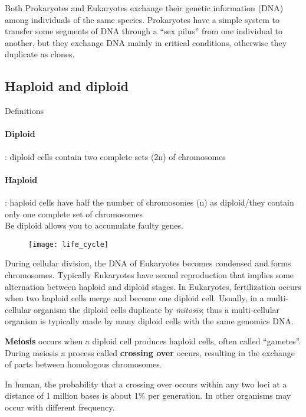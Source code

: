 Both Prokaryotes and Eukaryotes exchange their genetic information (DNA)
among individuals of the same species. Prokaryotes have a simple system to
transfer some segments of DNA through a ``sex pilus'' from one individual to
another, but they exchange DNA mainly in critical conditions, otherwise they
duplicate as clones.

\subsection{Haploid and diploid}

Definitions

\paragraph*{Diploid}: diploid cells contain two complete sets (2n) of
chromosomes

\paragraph*{Haploid}: haploid cells have half the number of chromosomes (n) as
diploid/they contain only one complete set of chromosomes \\


Be diploid allows you to accumulate faulty genes.

\begin{figure}[H]
  \centering
  \texttt{[image: life\_cycle]}
\end{figure}

During cellular division, the DNA of Eukaryotes becomes condensed and forms
chromosomes. Typically Eukaryotes have sexual reproduction that implies some
alternation between haploid and diploid stages. In Eukaryotes, fertilization
occurs when two haploid cells merge and become one diploid cell. Usually, in a
multi-cellular organism the diploid cells duplicate by \textit{mitosis}; thus a
multi-cellular organism is typically made by many diploid cells with the same
genomics DNA.

\textbf{Meiosis} occurs when a diploid cell produces haploid cells, often
called ``gametes''. During meiosis a process called \textbf{crossing over}
occurs, resulting in the exchange of parts between homologous chromosomes. 

In human, the probability that a crossing over occurs within any two loci at
a distance of 1 million bases is about 1\% per generation.
In other organisms may occur with different frequency.

